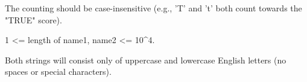 The counting should be case-insensitive (e.g., 'T' and 't' both count towards the "TRUE" score).

1 <= length of name1, name2 <= 10^4.

Both strings will consist only of uppercase and lowercase English letters (no spaces or special characters).